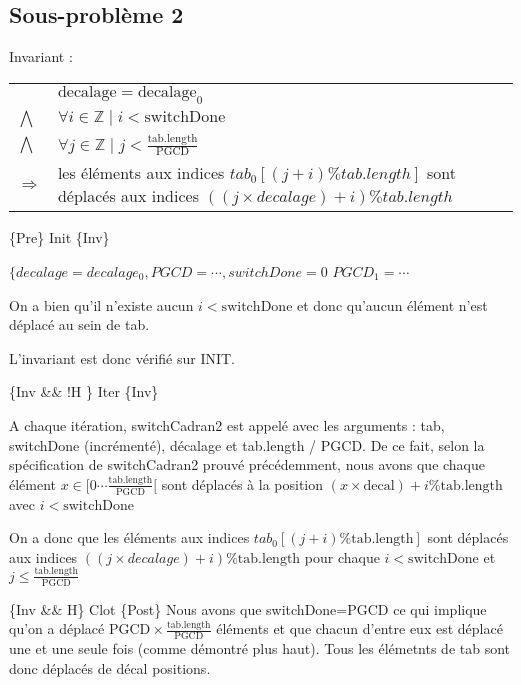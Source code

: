 \subsection{Sous-problème 2}

Invariant :

\begin{tabular}{ll}

& $\mathrm{decalage}=\mathrm{decalage}_{0}$ \\
$\bigwedge$ & $\forall i \in \mathbb{Z} \mid i < \mathrm{switchDone} $ \\
$\bigwedge$ & $\forall j \in \mathbb{Z} \mid j < \frac{\mathrm{tab.length}}{\mathrm{PGCD}}$ \\
$\Rightarrow$ & les éléments aux indices $tab_{0}[(j+i) \% tab.length]$ sont déplacés aux indices $((j\times decalage)+i) \% tab.length$
\end{tabular}

\{Pre\} Init \{Inv\}

$\{decalage=decalage_{0}, PGCD =\cdots, switchDone=0$
$PGCD_{1} = \cdots$

On a bien qu'il n'existe aucun $i < \mathrm{switchDone}$ et donc
qu'aucun élément n'est déplacé au sein de tab.

L'invariant est donc vérifié sur INIT.

\{Inv \&\& !H \} Iter \{Inv\}

A chaque itération, switchCadran2 est appelé avec les arguments : tab,
switchDone (incrémenté), décalage et tab.length / PGCD. De ce fait,
selon la spécification de switchCadran2 prouvé précédemment, nous avons
que chaque élément $x \in [0\cdots
    \frac{\mathrm{tab.length}}{\mathrm{PGCD}}[$ sont déplacés à la
        position $(x\times \mathrm{decal})+i \% \mathrm{tab.length}$ avec $i < \mathrm{switchDone}$

On a donc que les éléments aux indices
$tab_{0}[(j+i)\%\mathrm{tab.length}]$ sont déplacés aux indices
$((j\times decalage) + i) \% \mathrm{tab.length}$ pour chaque $i <
\mathrm{switchDone}$
et $j \leq \frac{\mathrm{tab.length}}{\mathrm{PGCD}}$

\{Inv \&\& H\} Clot \{Post\} Nous avons que switchDone=PGCD ce qui implique qu'on a déplacé
$\mathrm{PGCD}\times \frac{\mathrm{tab.length}}{\mathrm{PGCD}}$ éléments et
que chacun d'entre eux est déplacé une et une seule fois (comme démontré
plus haut). Tous les élémetnts de tab sont donc déplacés de décal positions.
